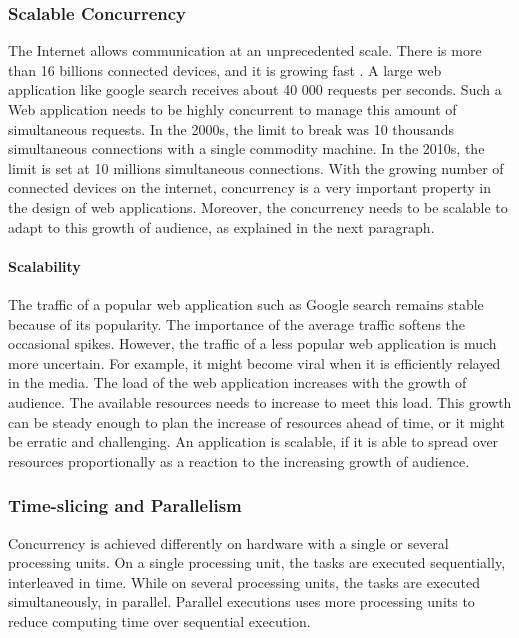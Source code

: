 \subsubsection{Scalable Concurrency}

The Internet allows communication at an unprecedented scale.
There is more than 16 billions connected devices, and it is growing fast \cite{Hilbert2011}.
A large web application like google search receives about 40 000 requests per seconds.
Such a Web application needs to be highly concurrent to manage this amount of simultaneous requests.
In the 2000s, the limit to break was 10 thousands simultaneous connections with a single commodity machine.
In the 2010s, the limit is set at 10 millions simultaneous connections.
With the growing number of connected devices on the internet, concurrency is a very important property in the design of web applications.
Moreover, the concurrency needs to be scalable to adapt to this growth of audience, as explained in the next paragraph.

\paragraph{Scalability}

The traffic of a popular web application such as Google search remains stable because of its popularity.
The importance of the average traffic softens the occasional spikes.
However, the traffic of a less popular web application is much more uncertain.
For example, it might become viral when it is efficiently relayed in the media.
The load of the web application increases with the growth of audience.
The available resources needs to increase to meet this load.
This growth can be steady enough to plan the increase of resources ahead of time, or it might be erratic and challenging.
An application is scalable, if it is able to spread over resources proportionally as a reaction to the increasing growth of audience.

\subsubsection{Time-slicing and Parallelism}

Concurrency is achieved differently on hardware with a single or several processing units.
On a single processing unit, the tasks are executed sequentially, interleaved in time.
While on several processing units, the tasks are executed simultaneously, in parallel.
Parallel executions uses more processing units to reduce computing time over sequential execution.

